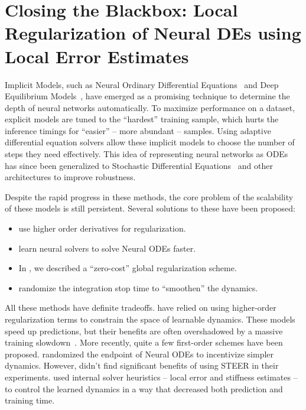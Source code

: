 \chapter{Closing the Blackbox: Local Regularization of Neural DEs using Local Error Estimates}
\label{chapter:local_regularization_neural_odes}

Implicit Models, such as Neural Ordinary Differential Equations~\cite{chen2018neural} and Deep Equilibrium Models~\cite{bai_deep_2019, pal2022mixing}, have emerged as a promising technique to determine the depth of neural networks automatically. To maximize performance on a dataset, explicit models are tuned to the ``hardest'' training sample, which hurts the inference timings for ``easier'' -- more abundant -- samples. Using adaptive differential equation solvers allow these implicit models to choose the number of steps they need effectively. This idea of representing neural networks as ODEs has since been generalized to Stochastic Differential Equations~\citep{liu2019neural, rackauckas2020universal} and other architectures to improve robustness.

Despite the rapid progress in these methods, the core problem of the scalability of these models is still persistent. Several solutions to these have been proposed:
%
\begin{itemize}
  \item \citet{kelly2020learning, finlay2020train} use higher order derivatives for regularization.
  \item \citet{poli2020hypersolvers} learn neural solvers to solve Neural ODEs faster.
  \item In , we described a ``zero-cost'' global regularization scheme.
  \item \citet{ghosh2020steer} randomize the integration stop time to ``smoothen'' the dynamics.
\end{itemize}
%
All these methods have definite tradeoffs. \citet{finlay2020train, kelly2020learning} have relied on using higher-order regularization terms to constrain the space of learnable dynamics. These models speed up predictions, but their benefits are often overshadowed by a massive training slowdown~\citep{pal2021opening}. More recently, quite a few first-order schemes have been proposed. \citet{ghosh2020steer} randomized the endpoint of Neural ODEs to incentivize simpler dynamics. However, \citet{pal2021opening} didn't find significant benefits of using STEER in their experiments. \citet{pal2021opening} used internal solver heuristics -- local error and stiffness estimates -- to control the learned dynamics in a way that decreased both prediction and training time.

